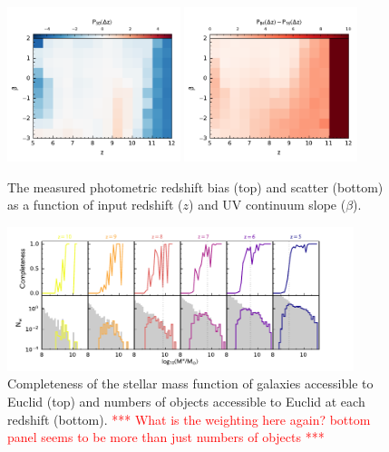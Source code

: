 \begin{figure}
	\centering
	\includegraphics[width=0.45\textwidth]{./figures/beta/beta_bias.pdf}
  \includegraphics[width=0.45\textwidth]{./figures/beta/beta_scatter.pdf}
	\caption{The measured photometric redshift bias (top) and scatter (bottom) as a function of input redshift ($z$) and UV continuum slope ($\beta$). \label{fig:beta_bias_scatter}}
\end{figure}


\onecolumn

\begin{figure}
	\centering
	\includegraphics[width=0.9\textwidth]{figures/physical/hist_Mstar_30.pdf}
	\caption{Completeness of the stellar mass function of galaxies accessible to Euclid (top) and numbers of objects accessible to Euclid at each redshift (bottom). \textcolor{red}{*** What is the weighting here again? bottom panel seems to be more than just numbers of objects ***}}
	\label{fig:physical:mstar}
\end{figure}

